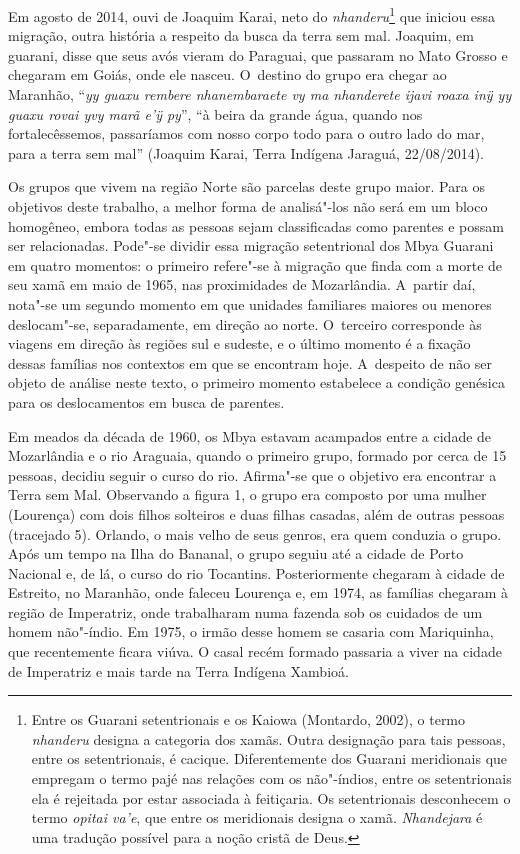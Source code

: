 Em agosto de 2014, ouvi de Joaquim Karai, neto do
\emph{nhanderu}\footnote{Entre os Guarani setentrionais e os Kaiowa (Montardo,
2002), o termo \emph{nhanderu} designa a categoria dos xamãs. Outra designação
para tais pessoas, entre os setentrionais, é cacique. Diferentemente
dos Guarani meridionais que empregam o termo pajé nas relações com os
não"-índios, entre os setentrionais ela é rejeitada por estar associada à
feitiçaria. Os setentrionais desconhecem o termo \emph{opitai va’e}, que entre
os meridionais designa o xamã. \emph{Nhandejara} é uma tradução possível para
a noção cristã de Deus.} que iniciou essa migração, outra história a
respeito da busca da terra sem mal. Joaquim, em guarani, disse que seus
avós vieram do Paraguai, que passaram no Mato Grosso e chegaram em
Goiás, onde ele nasceu. O~destino do grupo era chegar ao Maranhão, ``\emph{yy
guaxu rembere nhanembaraete vy ma nhanderete ijavi roaxa inÿ yy guaxu
rovai yvy marã e’ÿ py}'', ``à beira da grande água, quando nos
fortalecêssemos, passaríamos com nosso corpo todo para o outro lado do
mar, para a terra sem mal'' (Joaquim Karai, Terra Indígena Jaraguá,
22/08/2014).

Os grupos que vivem na região Norte são parcelas deste grupo maior. Para
os objetivos deste trabalho, a melhor forma de analisá"-los não será em
um bloco homogêneo, embora todas as pessoas sejam classificadas como
parentes e possam ser relacionadas. Pode"-se dividir essa migração
setentrional dos Mbya Guarani em quatro momentos: o primeiro refere"-se
à migração que finda com a morte de seu xamã em maio de 1965, nas
proximidades de Mozarlândia. A~partir daí, nota"-se um segundo momento
em que unidades familiares maiores ou menores deslocam"-se,
separadamente, em direção ao norte. O~terceiro corresponde às viagens
em direção às regiões sul e sudeste, e o último momento é a fixação
dessas famílias nos contextos em que se encontram hoje. A~despeito de
não ser objeto de análise neste texto, o primeiro momento estabelece a
condição genésica para os deslocamentos em busca de parentes.

Em meados da década de 1960, os Mbya estavam acampados 
entre a cidade de Mozarlândia e o rio Araguaia, quando o primeiro
grupo, formado por cerca de 15 pessoas, decidiu seguir o curso do rio.
Afirma"-se que o objetivo era encontrar a Terra sem Mal. Observando a
figura 1, o grupo era composto por uma mulher (Lourença) com dois
filhos solteiros e duas filhas casadas, além de outras pessoas
(tracejado 5). Orlando, o mais velho de seus genros, era quem conduzia
o grupo. Após um tempo na Ilha do Bananal, o grupo seguiu até a cidade
de Porto Nacional e, de lá, o curso do rio Tocantins. Posteriormente
chegaram à cidade de Estreito, no Maranhão, onde faleceu Lourença e, em
1974, as famílias chegaram à região de Imperatriz, onde trabalharam
numa fazenda sob os cuidados de um homem não"-índio. Em 1975, o irmão
desse homem se casaria com Mariquinha, que recentemente ficara viúva. O
casal recém formado passaria a viver na cidade de Imperatriz e mais
tarde na Terra Indígena Xambioá. 

